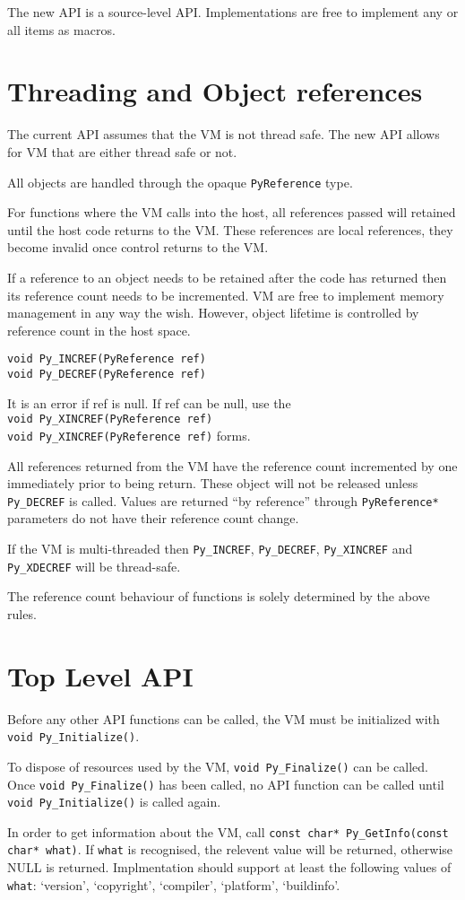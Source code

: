 \documentclass[a4paper,10pt]{article}
\begin{document}
The new API is a source-level API. Implementations are free to implement any or all items as macros.

\section{Threading and Object references}

The current API assumes that the VM is not thread safe.
The new API allows for VM that are either thread safe or not.

All objects are handled through the opaque \verb|PyReference| type.

For functions where the VM calls into the host, 
all references passed will retained until the host code returns to the VM.
These references are local references, they become invalid once control returns to the VM.

If a reference to an object needs to be retained after the code has returned then 
its reference count needs to be incremented. 
VM are free to implement memory management in any way the wish.
However, object lifetime is controlled by reference count in the host space.

\verb|void Py_INCREF(PyReference ref)| \\
\verb|void Py_DECREF(PyReference ref)|

It is an error if ref is null.
If ref can be null, use the  \\
\verb|void Py_XINCREF(PyReference ref)| \\
\verb|void Py_XINCREF(PyReference ref)| forms.

All references returned from the VM have the reference count incremented by one immediately prior to being return.
These object will not be released unless \verb|Py_DECREF| is called.
Values are returned ``by reference'' through \verb|PyReference*| parameters do not have their reference count change.

If the VM is multi-threaded then \verb|Py_INCREF|, \verb|Py_DECREF|, \verb|Py_XINCREF| and \verb|Py_XDECREF| will be thread-safe.

The reference count behaviour of functions is solely determined by the above rules.

\section{Top Level API}

Before any other API functions can be called, the VM must be initialized with \verb|void Py_Initialize()|.

To dispose of resources used by the VM, \verb|void Py_Finalize()| can be called.
Once \verb|void Py_Finalize()| has been called, no API function can be called until \verb|void Py_Initialize()| 
is called again.

In order to get information about the VM, call \verb|const char* Py_GetInfo(const char* what)|.
If \verb|what| is recognised, the relevent value will be returned, otherwise NULL is returned.
Implmentation should support at least the following values of \verb|what|: `version', `copyright', `compiler', `platform', `buildinfo'.
\end{document}
